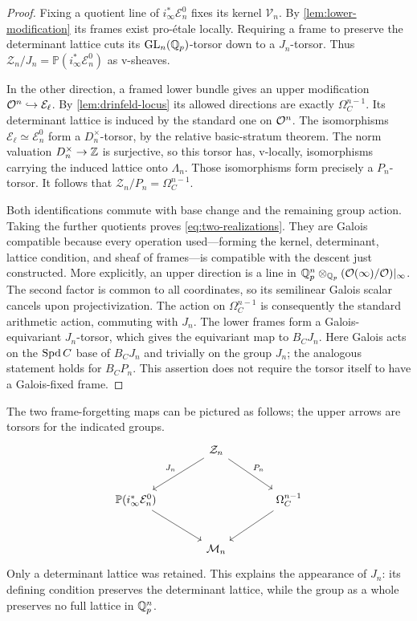 \begin{proof}
Fixing a quotient line of $i_\infty^*\mathcal E_n^0$ fixes its kernel
$\mathcal V_n$.  By \cref{lem:lower-modification} its frames exist
pro-\'etale locally.  Requiring a frame to preserve the determinant
lattice cuts its $\operatorname{GL}_n(\mathbb Q_p)$-torsor down to a $J_n$-torsor.
Thus
$\mathcal Z_n/J_n=\mathbb P(i_\infty^*\mathcal E_n^0)$
as v-sheaves.

In the other direction, a framed lower bundle gives an upper
modification $\mathcal O^n\hookrightarrow\mathcal E_\ell$.
By \cref{lem:drinfeld-locus} its allowed directions are exactly
$\Omega_C^{n-1}$.  Its determinant lattice is induced by the standard
one on $\mathcal O^n$.  The isomorphisms
$\mathcal E_\ell\simeq\mathcal E_n^0$ form a $D_n^\times$-torsor,
by the relative basic-stratum theorem.  The norm valuation
$D_n^\times\to\mathbb Z$ is surjective, so this torsor has, v-locally,
isomorphisms carrying the induced lattice onto $\Lambda_n$.
Those isomorphisms form precisely a $P_n$-torsor.
It follows that $\mathcal Z_n/P_n=\Omega_C^{n-1}$.

Both identifications commute with base change and the remaining group
action.  Taking the further quotients proves
\cref{eq:two-realizations}.  They are Galois compatible because every
operation used---forming the kernel, determinant, lattice condition,
and sheaf of frames---is compatible with the descent just constructed.
More explicitly, an upper direction is a line in
$\mathbb Q_p^n\otimes_{\mathbb Q_p}(\mathcal O(\infty)/\mathcal O)|_\infty$.
The second factor is common to all coordinates, so its semilinear
Galois scalar cancels upon projectivization.  The action on
$\Omega_C^{n-1}$ is consequently the standard arithmetic action,
commuting with $J_n$.  The lower frames form a Galois-equivariant
$J_n$-torsor, which gives the equivariant map to $B_CJ_n$.
Here Galois acts on the $\operatorname{Spd} C$ base of $B_CJ_n$ and trivially on
the group $J_n$; the analogous statement holds for $B_CP_n$.
This assertion does not require
the torsor itself to have a Galois-fixed frame.
\end{proof}

The two frame-forgetting maps can be pictured as follows; the upper
arrows are torsors for the indicated groups.
\[
\begin{tikzcd}[column sep=large,row sep=large]
 & \mathcal Z_n \arrow[dl,"J_n"'] \arrow[dr,"P_n"] & \\
 \mathbb P(i_\infty^*\mathcal E_n^0)
       \arrow[dr] && \Omega_C^{n-1}\arrow[dl]\\
 & \mathcal M_n &
\end{tikzcd}
\]
Only a determinant lattice was retained.  This explains the appearance
of $J_n$: its defining condition preserves the determinant lattice,
while the group as a whole preserves no full lattice in $\mathbb Q_p^n$.

